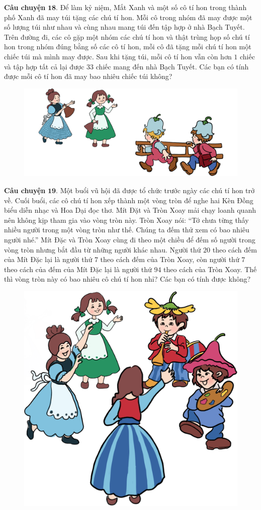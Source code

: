 	\textbf{\color{toancuabi}Câu chuyện} $\pmb{18.}$ Để làm kỷ niệm, Mắt Xanh và một số cô tí hon trong thành phố Xanh đã may túi tặng các chú tí hon. Mỗi cô trong nhóm đã may được một số lượng túi như nhau và cùng nhau mang túi đến tập hợp ở nhà Bạch Tuyết. Trên đường đi, các cô gặp một nhóm các chú tí hon và thật trùng họp số chú tí hon trong nhóm đúng bằng số các cô tí hon, mỗi cô đã tặng mỗi chú tí hon một chiếc túi mà mình may được. Sau khi tặng túi, mỗi cô tí hon vẫn còn hơn $1$ chiếc và tập hợp tất cả lại được $33$ chiếc mang đến nhà Bạch Tuyết. Các bạn có tính được mỗi cô tí hon đã may bao nhiêu chiếc túi không?
		\begin{figure}[H]
		\centering
		\vspace*{-5pt}
		\captionsetup{labelformat= empty, justification=centering}
		\includegraphics[width=0.65\linewidth]{Hinh20_TangTui}
		\vspace*{-10pt}
	\end{figure}
	\textbf{\color{toancuabi}Câu chuyện} $\pmb{19.}$ Một buổi vũ hội đã được tổ chức trước ngày các chú tí hon trở về. Cuối buổi, các cô chú tí hon xếp thành một vòng tròn để nghe hai Kèn Đồng biểu diễn nhạc và Hoa Dại đọc thơ. Mít Đặt và Tròn Xoay mải chạy loanh quanh nên không kịp tham gia vào vòng tròn này. Tròn Xoay nói: “Tớ chưa từng thấy nhiều người trong một vòng tròn như thế. Chúng ta đếm thử xem có bao nhiêu người nhé.” Mít Đặc và Tròn Xoay cùng đi theo một chiều để đếm số người trong vòng tròn nhưng bắt đầu từ những người khác nhau. Người thứ $20$ theo cách đếm của Mít Đặc lại là người thứ $7$ theo cách đếm của Tròn Xoay, còn người thứ $7$ theo cách của đếm của Mít Đặc lại là người thứ $94$ theo cách của Tròn Xoay. Thế thì vòng tròn này có bao nhiêu cô chú tí hon nhỉ? Các bạn có tính được không?
		\begin{figure}[H]
		\centering
		\vspace*{-5pt}
		\captionsetup{labelformat= empty, justification=centering}
		\includegraphics[width=0.5\linewidth]{Hinh21_VongTron}
		\vspace*{-15pt}
	\end{figure}
